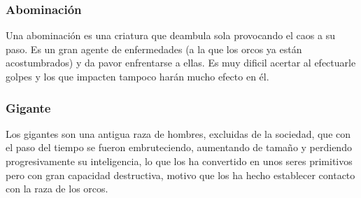 
\subsubsection*{Abominación}
Una abominación es una criatura que deambula sola provocando el caos a
su paso. Es un gran agente de enfermedades (a la que los orcos ya
están acostumbrados) y da pavor enfrentarse a ellas. Es muy dificil
acertar al efectuarle golpes y los que impacten tampoco harán mucho
efecto en él.


\subsubsection*{Gigante}
Los gigantes son una antigua raza de hombres, excluidas de la
sociedad, que con el paso del tiempo se fueron embruteciendo,
aumentando de tamaño y perdiendo progresivamente su inteligencia, lo
que los ha convertido en unos seres primitivos pero con gran capacidad
destructiva, motivo que los ha hecho establecer contacto con la raza
de los orcos.

